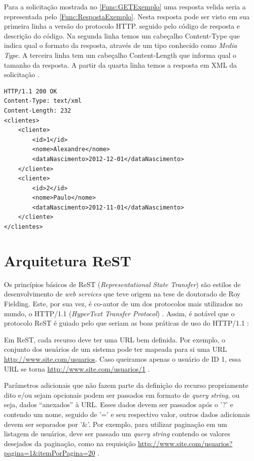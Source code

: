 Para a solicitação mostrada no \autoref{Func:GETExemplo} uma resposta velida seria a representada pelo \autoref{Func:RespostaExemplo}.
Nesta resposta pode ser visto em sua primeira linha a versão do protocolo HTTP. seguido pelo código de resposta e descrição do código.
Na segunda linha temos um cabeçalho Content-Type que indica qual o formato da resposta, através de um tipo conhecido como \textit{Media Type}.
A terceira linha tem um cabeçalho Content-Length que informa qual o tamanho da resposta.
A partir da quarta linha temos a resposta em XML da solicitação \cite{Saudate:2014}.



\begin{lstlisting}[label=Func:RespostaExemplo,caption={[Exemplo de uma resposta HTTP com status 200.]Exemplo de uma resposta HTTP com status 200, possuindo um Content-Type:text/xml informando que a resposta é em formato XML, e a resposta a solicitação.}]
HTTP/1.1 200 OK
Content-Type: text/xml
Content-Length: 232
<clientes>
	<cliente>
		<id>1</id>
		<nome>Alexandre</nome>
		<dataNascimento>2012-12-01</dataNascimento>
	</cliente>
	<cliente>
		<id>2</id>
		<nome>Paulo</nome>
		<dataNascimento>2012-11-01</dataNascimento>
	</cliente>
</clientes>
\end{lstlisting}


\section{Arquitetura ReST} \label{sec:ArquiteturaReST}

Os princípios básicos de ReST (\textit{Representational State Transfer}) são estilos de desenvolvimento
de \textit{web services} que teve origem na tese de doutorado de Roy Fielding. 
Este, por sua vez, é co-autor de um dos protocolos mais utilizados no mundo, o HTTP/1.1 (\textit{HyperText Transfer Protocol}) \cite{Boagrio:2017} \cite{Saudate:2014}.  
Assim, é notável que o protocolo ReST é guiado pelo que seriam as boas práticas de uso do HTTP/1.1 \cite{Saudate:2014}:


Em ReST, cada recurso deve ter uma URL bem definida. Por exemplo, o conjunto dos usuários de um sistema pode ter mapeada para si uma URL \url{http://www.site.com/usuarios}. Caso queiramos apenas o usuário de ID 1, essa URL se torna \url{http://www.site.com/usuarios/1} \cite{Saudate:2012}.

Parâmetros adicionais que não fazem parte da definição do recurso propriamente dito e/ou sejam opcionais podem ser passados em formato de \textit{query string}, ou seja, dados “anexados” à URL. 
Esses dados devem ser passados após o '?' e contendo um nome, seguido de '=' e seu respectivo valor, outros dados adicionais devem ser separados por '\&'. 
Por exemplo, para utilizar paginação em um listagem de usuários, deve ser passado um \textit{query string} contendo os valores desejados da paginação, como na requisição \url{http://www.site.com/usuarios?pagina=1\&itemPorPagina=20} \cite{Saudate:2012}.


